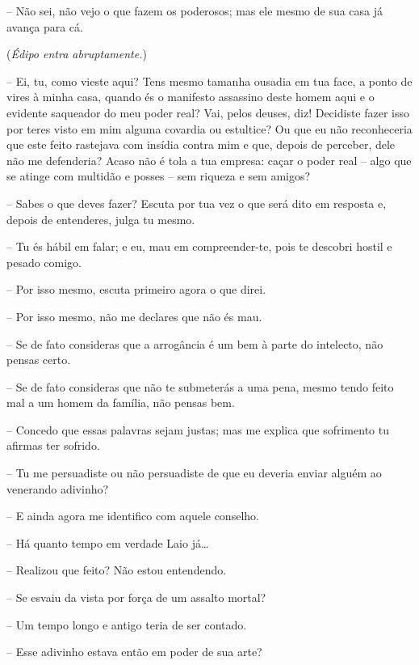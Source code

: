  --    Não sei, não vejo o que fazem os poderosos; mas ele mesmo de sua
casa já avança para cá.

(\emph{Édipo entra abruptamente.})

 --   Ei, tu, como vieste aqui? Tens mesmo tamanha ousadia em tua face, a
ponto de vires à minha casa, quando és o manifesto assassino deste homem
aqui e o evidente saqueador do meu poder real? Vai, pelos deuses, diz!
Decidiste fazer isso por teres visto em mim alguma covardia ou
estultice? Ou que eu não reconheceria que este feito rastejava com
insídia contra mim e que, depois de perceber, dele não me defenderia?
 Acaso não é tola a tua empresa: caçar o poder real -- algo que se
atinge com multidão e posses -- sem riqueza e sem amigos?

 --   Sabes o que deves fazer? Escuta por tua vez o que será dito em resposta
e, depois de entenderes, julga tu mesmo.

 --   Tu és hábil em falar; e eu, mau em compreender-te, pois te descobri
hostil e pesado comigo.

 --   Por isso mesmo, escuta primeiro agora o que direi.

 --   Por isso mesmo, não me declares que não és mau.

 --   Se de fato consideras que a arrogância é um bem à parte do intelecto,
não  pensas certo.

 --   Se de fato consideras que não te submeterás a uma pena, mesmo tendo
feito mal a um homem da família, não pensas bem.

 --   Concedo que essas palavras sejam justas; mas me explica que sofrimento
tu afirmas ter sofrido.

 --   Tu me persuadiste ou não persuadiste de que eu deveria enviar alguém ao
venerando adivinho?

 --   E ainda agora me identifico com aquele conselho.

  -- Há quanto tempo em verdade Laio já\ldots{}  

 --   Realizou que feito? Não estou entendendo.

 --    Se esvaiu da vista por força de um assalto mortal?

 --   Um tempo longo e antigo teria de ser contado.

 --   Esse adivinho estava então em poder de sua arte?

